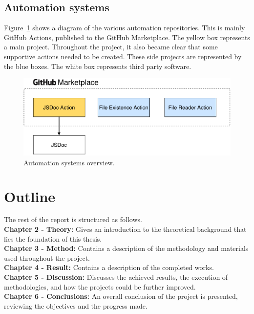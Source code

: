 \subsection{Automation systems}
Figure~\ref{fig:automation-systems-overview} shows a diagram of the various automation repositories. This is mainly GitHub Actions, published to the GitHub Marketplace. The yellow box represents a main project. Throughout the project, it also became clear that some supportive actions needed to be created. These side projects are represented by the blue boxes. The white box represents third party software.
\begin{figure}[ht]
    \centering
    \includegraphics[page=1,scale=0.85]{sections/introduction/figures/automation-systems-overview.pdf}
    \caption{Automation systems overview.}
    \label{fig:automation-systems-overview}
\end{figure}

\section{Outline}

The rest of the report is structured as follows.\\
\textbf{Chapter 2 - Theory:} Gives an introduction to the theoretical background that lies the foundation of this thesis.\\
\textbf{Chapter 3 - Method:} Contains a description of the methodology and materials used throughout the project.\\
\textbf{Chapter 4 - Result:} Contains a description of the completed works.\\
\textbf{Chapter 5 - Discussion:} Discusses the achieved results, the execution of methodologies, and how the projects could be further improved.\\
\textbf{Chapter 6 - Conclusions:} An overall conclusion of the project is presented, reviewing the objectives and the progress made.